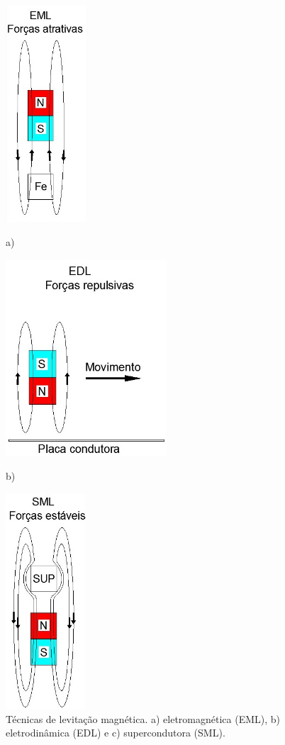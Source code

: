 \documentclass[
        oneside,      %
        english,			
        brazil			 
        ]{configcefetmglpd}
\begin{document}
\begin{figure}[h]
	\larguratexto{14cm}
	\centering
	\caption{Técnicas de levitação magnética. a) eletromagnética (EML), b) eletrodinâmica (EDL) e c) supercondutora (SML).}%
	\begin{minipage}[t]{3cm}%
		\includegraphics[width=3cm]{cap3_1.jpg}
		\par \centering a)
		\label{fig:EML}
	\end{minipage}%
	\hspace{1cm}
	\begin{minipage}[t]{6cm}%
		\includegraphics[width=6cm]{cap3_2.jpg}
		\par \centering b)
		\label{fig:EDL}
	\end{minipage}%
	\hspace{1cm}
\begin{minipage}[t]{3cm}%
	\includegraphics[width=3cm]{cap3_3.jpg}

\end{minipage}
\end{figure}
\end{document}
